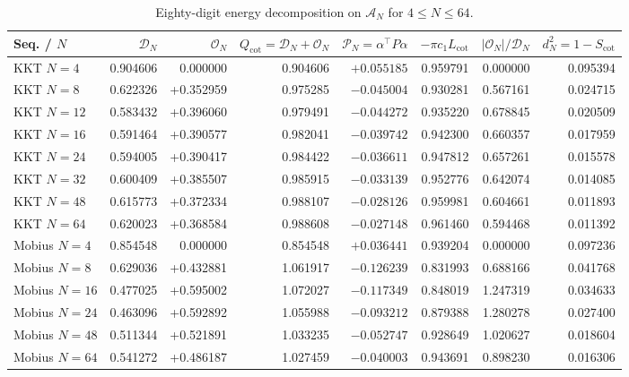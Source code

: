 \documentclass[10pt,a4paper]{article}
\theoremstyle{definition}
\begin{document}
\begin{table}[htbp]
\centering
\footnotesize
\setlength{\tabcolsep}{4.2pt}
\begin{tabular}{@{}lrrrrrrr@{}}
\toprule
\textbf{Seq. / $N$} & $\mathcal{D}_N$ & $\mathcal{O}_N$ & $Q_{\mathrm{cot}} = \mathcal{D}_N+\mathcal{O}_N$ & $\mathcal{P}_N = \alpha^\top P \alpha$ & $-\pi c_1 L_{\mathrm{cot}}$ & $|\mathcal{O}_N|/\mathcal{D}_N$ & $d_N^2 = 1-S_{\mathrm{cot}}$ \\
\midrule
KKT $N=4$   & 0.904606 &  0.000000 & 0.904606 & $+0.055185$ & 0.959791 & 0.000000 & 0.095394 \\
KKT $N=8$   & 0.622326 & +0.352959 & 0.975285 & $-0.045004$ & 0.930281 & 0.567161 & 0.024715 \\
KKT $N=12$  & 0.583432 & +0.396060 & 0.979491 & $-0.044272$ & 0.935220 & 0.678845 & 0.020509 \\
KKT $N=16$  & 0.591464 & +0.390577 & 0.982041 & $-0.039742$ & 0.942300 & 0.660357 & 0.017959 \\
KKT $N=24$  & 0.594005 & +0.390417 & 0.984422 & $-0.036611$ & 0.947812 & 0.657261 & 0.015578 \\
KKT $N=32$  & 0.600409 & +0.385507 & 0.985915 & $-0.033139$ & 0.952776 & 0.642074 & 0.014085 \\
KKT $N=48$  & 0.615773 & +0.372334 & 0.988107 & $-0.028126$ & 0.959981 & 0.604661 & 0.011893 \\
KKT $N=64$  & 0.620023 & +0.368584 & 0.988608 & $-0.027148$ & 0.961460 & 0.594468 & 0.011392 \\
\midrule
Mobius $N=4$  & 0.854548 &  0.000000 & 0.854548 & $+0.036441$ & 0.939204 & 0.000000 & 0.097236 \\
Mobius $N=8$  & 0.629036 & +0.432881 & 1.061917 & $-0.126239$ & 0.831993 & 0.688166 & 0.041768 \\
Mobius $N=16$ & 0.477025 & +0.595002 & 1.072027 & $-0.117349$ & 0.848019 & 1.247319 & 0.034633 \\
Mobius $N=24$ & 0.463096 & +0.592892 & 1.055988 & $-0.093212$ & 0.879388 & 1.280278 & 0.027400 \\
Mobius $N=48$ & 0.511344 & +0.521891 & 1.033235 & $-0.052747$ & 0.928649 & 1.020627 & 0.018604 \\
Mobius $N=64$ & 0.541272 & +0.486187 & 1.027459 & $-0.040003$ & 0.943691 & 0.898230 & 0.016306 \\
\bottomrule
\end{tabular}
\caption{Eighty-digit energy decomposition on $\mathcal{A}_N$ for $4 \le N \le 64$.}
\label{tab:frontier_energies}
\end{table}
\end{document}
